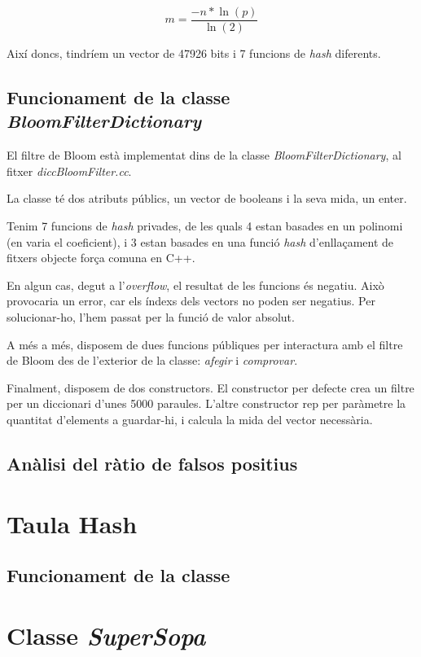 \documentclass[titlepage]{article}
\begin{document}
\[m = \frac{-n * \ln(p)}{\ln(2)}\]

Així doncs, tindríem un vector de 47926 bits i 7 funcions de \textit{hash} diferents.

\subsection{Funcionament de la classe \textit{BloomFilterDictionary}}
El filtre de Bloom està implementat dins de la classe \textit{BloomFilterDictionary}, al fitxer \textit{diccBloomFilter.cc}.

La classe té dos atributs públics, un vector de booleans i la seva mida, un enter.

Tenim 7 funcions de \textit{hash} privades, de les quals 4 estan basades en un polinomi (en varia el coeficient), i 3 estan basades en una funció \textit{hash} d'enllaçament de fitxers objecte força comuna en C++.

En algun cas, degut a l'\textit{overflow}, el resultat de les funcions és negatiu. Això provocaria un error, car els índexs dels vectors no poden ser negatius. Per solucionar-ho, l'hem passat per la funció de valor absolut.

A més a més, disposem de dues funcions públiques per interactura amb el filtre de Bloom des de l'exterior de la classe: \textit{afegir} i \textit{comprovar}. 

Finalment, disposem de dos constructors. El constructor per defecte crea un filtre per un diccionari d'unes 5000 paraules. L'altre constructor rep per paràmetre la quantitat d'elements a guardar-hi, i calcula la mida del vector necessària. 
\subsection{Anàlisi del ràtio de falsos positius}

\clearpage
\section{Taula Hash}
\subsection{Funcionament de la classe}

\clearpage
\section{Classe \textit{SuperSopa}}
\end{document}
